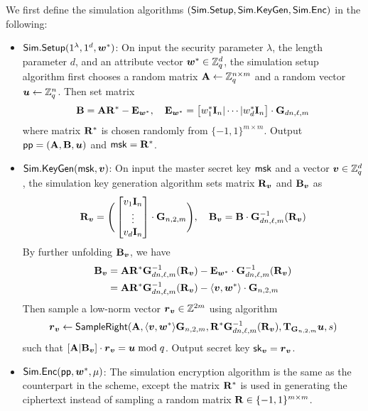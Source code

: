 We first define the simulation algorithms $(\mathsf{Sim}.\mathsf{Setup},\mathsf{Sim}.\mathsf{KeyGen}, \mathsf{Sim}.\mathsf{Enc})$ in the following:
\begin{itemize}[leftmargin=*]
 \item $\mathsf{Sim}.\mathsf{Setup}(1^\lambda, 1^d, \boldsymbol{w}^*)$: On input the security parameter $\lambda$, the length parameter $d$, and an attribute vector $\boldsymbol{w}^{*} \in \mathbb{Z}^{d}_{q}$, the simulation setup algorithm first chooses a random matrix $\mathbf{A} \leftarrow \mathbb{Z}_q^{n \times m}$ and a random vector $\boldsymbol{u} \leftarrow \mathbb{Z}_q^n$. Then set matrix
 $$\mathbf{B} = \mathbf{A} \mathbf{R}^* - \mathbf{E}_{\boldsymbol{w}^*}, \quad \mathbf{E}_{\boldsymbol{w}^*} = \big[w^*_1 \mathbf{I}_n | \cdots | w^*_d \mathbf{I}_n \big] \cdot
\mathbf{G}_{dn, \ell, m}$$
where matrix $\mathbf{R}^*$ is chosen randomly from $\{-1, 1\}^{m \times m}$. Output $\mathsf{pp} = (\mathbf{A}, \mathbf{B}, \boldsymbol{u})$ and $\mathsf{msk} = \mathbf{R}^*$.

 \item $\mathsf{Sim}.\mathsf{KeyGen}(\mathsf{msk}, \boldsymbol{v})$: On input the master secret key $\mathsf{msk}$ and a vector $\boldsymbol{v} \in \mathbb{Z}_q^d$, the simulation key generation algorithm sets matrix $\mathbf{R}_{\boldsymbol{v}}$ and  $\mathbf{B}_{\boldsymbol{v}}$ as
 $$\mathbf{R}_{\boldsymbol{v}} =
 \Bigg(\begin{bmatrix}
v_{1}\mathbf{I}_n \\
\vdots \\
v_{d}\mathbf{I}_n
\end{bmatrix} \cdot \mathbf{G}_{n, 2, m}\Bigg), \quad \mathbf{B}_{\boldsymbol{v}} = \mathbf{B} \cdot \mathbf{G}_{dn, \ell, m}^{-1}(\mathbf{R}_{\boldsymbol{v}})$$
By further unfolding $\mathbf{B}_{\boldsymbol{v}}$, we have
\begin{align*}
\mathbf{B}_{\boldsymbol{v}} & = \mathbf{A} \mathbf{R}^*\mathbf{G}_{dn, \ell, m}^{-1}(\mathbf{R}_{\boldsymbol{v}}) -  \mathbf{E}_{\boldsymbol{w}^*} \cdot \mathbf{G}_{dn, \ell, m}^{-1}(\mathbf{R}_{\boldsymbol{v}}) \\
 & = \mathbf{A} \mathbf{R}^*\mathbf{G}_{dn, \ell, m}^{-1}(\mathbf{R}_{\boldsymbol{v}}) - \langle \boldsymbol{v}, \boldsymbol{w}^* \rangle \cdot \mathbf{G}_{n, 2, m}
\end{align*}
Then sample a low-norm vector $\boldsymbol{r}_{\boldsymbol{v}} \in \mathbb{Z}^{2m}$ using algorithm
$$\boldsymbol{r}_{\boldsymbol{v}} \leftarrow \mathsf{SampleRight}(\mathbf{A}, \langle \boldsymbol{v}, \boldsymbol{w}^* \rangle\mathbf{G}_{n, 2, m}, \mathbf{R}^*\mathbf{G}_{dn, \ell, m}^{-1}(\mathbf{R}_{\boldsymbol{v}}), \mathbf{T}_{\mathbf{G}_{n, 2, m}}  \boldsymbol{u}, s)$$
such that $[\mathbf{A} | \mathbf{B}_{\boldsymbol{v}}] \cdot \boldsymbol{r}_{\boldsymbol{v}} = \boldsymbol{u} \bmod q$. Output secret key $\mathsf{sk}_{\boldsymbol{v}} = \boldsymbol{r}_{\boldsymbol{v}}$.

 \item $\mathsf{Sim}.\mathsf{Enc}(\mathsf{pp}, \boldsymbol{w}^*, \mu)$: The simulation encryption algorithm is the same as the counterpart in the scheme, except the matrix $\mathbf{R}^*$ is used in generating the ciphertext instead of sampling a random matrix $\mathbf{R} \in \{-1, 1\}^{m \times m}$.
\end{itemize}

